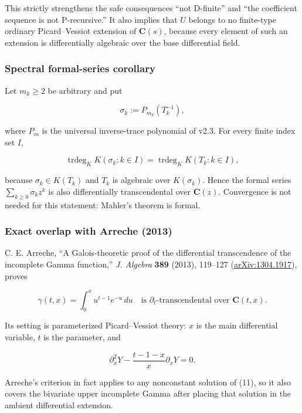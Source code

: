 This strictly strengthens the safe consequences ``not D-finite'' and ``the
coefficient sequence is not P-recursive.'' It also implies that \(U\) belongs
to no finite-type ordinary Picard--Vessiot extension of \(\mathbf C(s)\),
because every element of such an extension is differentially algebraic over
the base differential field.

\subsubsection{Spectral formal-series corollary}

Let \(m_k\ge2\) be arbitrary and put

\[
 \sigma_k:=P_{m_k}(T_k^{-1}),
\]

where \(P_m\) is the universal inverse-trace polynomial of v2.3. For every
finite index set \(I\),

\[
 \operatorname{trdeg}_K K(\sigma_k:k\in I)
 =\operatorname{trdeg}_K K(T_k:k\in I),                                    \tag{GT-9}
\]

because \(\sigma_k\in K(T_k)\) and \(T_k\) is algebraic over
\(K(\sigma_k)\). Hence the formal series \(\sum_{k\ge0}\sigma_kz^k\) is
also differentially transcendental over \(\mathbf C(z)\). Convergence is
not needed for this statement: Mahler's theorem is formal.

\subsubsection{Exact overlap with Arreche (2013)}

C. E. Arreche, ``A Galois-theoretic proof of the differential transcendence
of the incomplete Gamma function,'' \emph{J. Algebra} \textbf{389} (2013), 119--127
(\href{https://arxiv.org/abs/1304.1917}{arXiv:1304.1917}), proves

\[
 \gamma(t,x)=\int_0^x u^{t-1}e^{-u}\,du
 \quad\text{is }\partial_t\text{-transcendental over }\mathbf C(t,x).       \tag{GT-10}
\]

Its setting is parameterized Picard--Vessiot theory: \(x\) is the main
differential variable, \(t\) is the parameter, and

\[
 \partial_x^2Y-\frac{t-1-x}{x}\partial_xY=0.                               \tag{GT-11}
\]

Arreche's criterion in fact applies to any nonconstant solution of (11), so
it also covers the bivariate upper incomplete Gamma after placing that
solution in the ambient differential extension.


